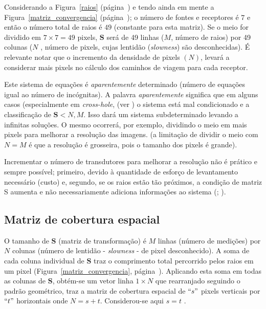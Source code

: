 \documentclass[a4paper, 12 pt]{article} %
\begin{document}
Considerando a Figura~\ref{raios} (página~\pageref{raios}) e tendo ainda em mente a Figura~\ref{matriz_convergencia} (página~\pageref{matriz_convergencia}); o número de fontes e receptores é $7$ e então o número total de raios é $49$ (constante para esta matriz). Se o meio for dividido em $7 \times 7 = 49$ pixels, $\textbf{S}$ será de 49 linhas ($M$, número de raios) por 49 colunas ($N$ , número de pixels, cujas lentidão (\textit{slowness}) são desconhecidas). É relevante notar que o incremento da densidade de pixels $(N)$, levará a considerar mais pixels no cálculo dos caminhos de viagem para cada receptor.

Este sistema de equações é \textit{aparentemente} determinado (número de equações igual ao número de incógnitas). A palavra \textit{aparentemente} significa que em alguns casos (especialmente em \textit{cross-hole}, (ver \citealp{imhof2007caracterizacion}) o sistema está mal condicionado e a classificação de $\textbf{S} < N , M$. Isso dará um sistema subdeterminado levando a infinitas soluções. O mesmo ocorrerá, por exemplo, dividindo o meio em mais pixels para melhorar a resolução das imagens. (a limitação de dividir o meio com $N = M$ é que a resolução é grosseira, pois o tamanho dos pixels é grande).

Incrementar o número de transdutores para melhorar a resolução não é prático e sempre possível; primeiro, devido à quantidade de esforço de levantamento necessário (custo) e, segundo, se os raios estão tão próximos, a condição de matriz S aumenta e não necessariamente adiciona informações ao sistema (\citealp{santamarina1998introduction}; \citealp{fernandez2000tomographic}).


\subsection{Matriz de cobertura espacial}

O tamanho de $\textbf{S}$ (matriz de transformação) é $M$ linhas (número de medições) por $N$ colunas (número de lentidão - \textit{slowness} - de pixel desconhecido). A soma de cada coluna individual de $\textbf{S}$ traz o comprimento total percorrido pelos raios em um pixel (Figura~\ref{matriz_convergencia}, página~\pageref{matriz_convergencia}). Aplicando esta soma em todas as colunas de $\textbf{S}$, obtém-se um vetor linha $1 \times N$ que rearranjado seguindo o padrão geométrico, traz a matriz de cobertura espacial de $``s"$ pixels verticais por $``t"$ horizontais onde $N = s + t$. Considerou-se aqui $s = t$ \citep{RBGf1495}.
\end{document}
